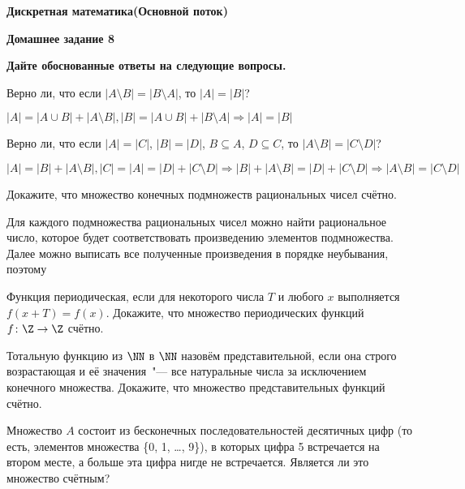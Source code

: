 \documentclass[11pt]{article}
\def\week{8}
\begin{document}
	\setcounter{problem}{0}
	\def\theproblem{Д\week.\arabic{problem}}
	{\textbf{\large Дискретная математика}\hfill \textbf{(Основной поток)}
		
		\medskip %
		
		\textbf{Домашнее задание \week}}
	
	\medskip
	
	\textbf{Дайте обоснованные ответы на следующие вопросы.}
	
	
	\vspace{5mm}
	
	\p \sp Верно ли, что если $|A\setminus B|=|B\setminus A|$, то $|A|=|B|$?
	
	$|A|= |A \cup B| + |A \setminus B|, |B| = |A \cup B| + |B \setminus A| \Rightarrow |A| = |B|$ \\
	
	\sp Верно ли, что если $|A|=|C|$, $|B|=|D|$, $B\subseteq A$, $D\subseteq C$, то $|A\setminus B|=|C\setminus D|$?
	
	$|A| = |B| + |A \setminus B|, |C| = |A| = |D| + |C \setminus D| \Rightarrow |B| + |A \setminus B| = |D| + |C \setminus D| \Rightarrow |A \setminus B| = |C \setminus D|$
	
	
	\p Докажите, что множество конечных подмножеств рациональных чисел
	счётно.
	
	Для каждого подмножества рациональных чисел можно найти рациональное число, которое будет соответствовать произведению элементов подмножества. Далее можно выписать все полученные произведения в порядке неубывания, поэтому 
	
	\p Функция периодическая, если для
	некоторого числа $T$ и любого $x$ выполняется $f(x+T)=f(x)$. Докажите,
	что множество периодических функций  $f\colon \Z\to\Z$ счётно.
	
	\p Тотальную функцию из $\NN$ в $\NN$ назовём представительной, если она строго возрастающая и её значения~"--- все натуральные числа за исключением конечного множества. Докажите, что множество представительных  функций счётно.
	
	\p Множество $A$ состоит из бесконечных последовательностей десятичных цифр (то есть,  элементов множества \{0, 1, \ldots, 9\}), в которых цифра 5 встречается на втором месте, а больше эта цифра нигде не встречается. Является ли это множество счётным?
	
	
\end{document}
